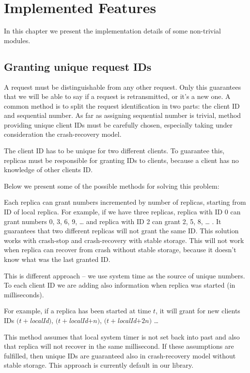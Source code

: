 \chapter{Implemented Features}

In this chapter we present the implementation details of some non-trivial modules.

\section{Granting unique request IDs}

A request must be distinguishable from any other request. Only this guarantees that we will be able to say if a request is retransmitted, or it's a new one. A common method is to split the request identification in two parts: the client ID and sequential number. As far as assigning sequential number is trivial, method providing unique client IDs must be carefully chosen, especially taking under consideration the crash-recovery model.

The client ID has to be unique for two different clients. To guarantee this, replicas must be responsible for granting IDs to clients, because a client has no knowledge of other clients ID.

Below we present some of the possible methods for solving this problem:

Each replica can grant numbers incremented by number of replicas, starting from ID of local replica. For example, if we have three replicas, replica with ID 0 can grant numbers 0, 3, 6, 9, \ldots{} and replica with ID 2 can grant 2, 5, 8, \ldots{} . It guarantees that two different replicas will not grant the same ID. This solution works with crash-stop and crash-recovery with stable storage. This will not work when replica can recover from crash without stable storage, because it doesn't know what was the last granted ID.

This is different approach -- we use system time as the source of unique numbers. To each client ID we are adding also information when replica was started (in milliseconds).

For example, if a replica has been started at time $t$, it will grant for new clients IDs $(t + $\textit{localId}$)$, $(t + $\textit{localId}$ + n)$, $(t + $\textit{localId}$ + 2n)$ \ldots

This method assumes that local system timer is not set back into past and also that replica will not recover in the same millisecond. If these assumptions are fulfilled, then unique IDs are guaranteed also in crash-recovery model without stable storage. This approach is currently default in our library.

